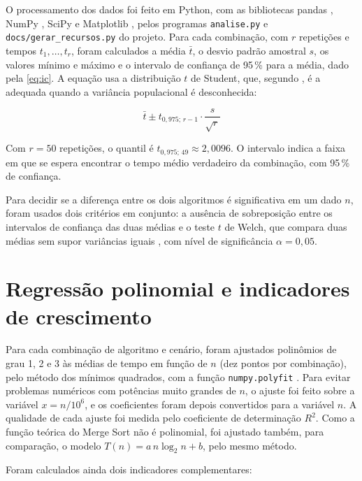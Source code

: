\documentclass[
    12pt,
    oneside,
    a4paper,
    openany,
    chapter=TITLE,
    english,
    brazil
]{abntex2}
\begin{document}
O processamento dos dados foi feito em Python, com as bibliotecas pandas \cite{mckinney2010}, NumPy \cite{harris2020}, SciPy \cite{virtanen2020} e Matplotlib \cite{hunter2007}, pelos programas \texttt{analise.py} e \texttt{docs/gerar\_recursos.py} do projeto. Para cada combinação, com $r$ repetições e tempos $t_1, \ldots, t_r$, foram calculados a média $\bar{t}$, o desvio padrão amostral $s$, os valores mínimo e máximo e o intervalo de confiança de 95\,\% para a média, dado pela \autoref{eq:ic}. A equação usa a distribuição $t$ de Student, que, segundo , é a adequada quando a variância populacional é desconhecida:

\begin{equation}
    \label{eq:ic}
    \bar{t} \pm t_{0{,}975;\,r-1} \cdot \frac{s}{\sqrt{r}}
\end{equation}

Com $r = 50$ repetições, o quantil é $t_{0{,}975;\,49} \approx 2{,}0096$. O intervalo indica a faixa em que se espera encontrar o tempo médio verdadeiro da combinação, com 95\,\% de confiança.

Para decidir se a diferença entre os dois algoritmos é significativa em um dado $n$, foram usados dois critérios em conjunto: a ausência de sobreposição entre os intervalos de confiança das duas médias e o teste $t$ de Welch, que compara duas médias sem supor variâncias iguais \cite{welch1947}, com nível de significância $\alpha = 0{,}05$.

\section{Regressão polinomial e indicadores de crescimento}
\label{sec:metodo-regressao}

Para cada combinação de algoritmo e cenário, foram ajustados polinômios de grau 1, 2 e 3 às médias de tempo em função de $n$ (dez pontos por combinação), pelo método dos mínimos quadrados, com a função \texttt{numpy.polyfit} \cite{harris2020}. Para evitar problemas numéricos com potências muito grandes de $n$, o ajuste foi feito sobre a variável $x = n / 10^6$, e os coeficientes foram depois convertidos para a variável $n$. A qualidade de cada ajuste foi medida pelo coeficiente de determinação $R^2$. Como a função teórica do Merge Sort não é polinomial, foi ajustado também, para comparação, o modelo $T(n) = a \, n \log_2 n + b$, pelo mesmo método.

Foram calculados ainda dois indicadores complementares:
\end{document}
